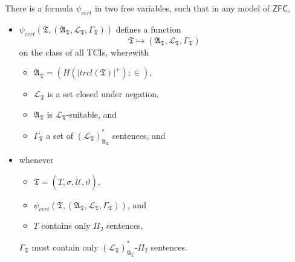 \documentclass[12pt]{article}
\numberwithin{equation}{section}
\begin{document}
\begin{lem}\label{mcequiv}
There is a formula $\psi_{cert}$ in two free variables, such that in any model of $\mathsf{ZFC}$, 
\begin{itemize}
    \item $\psi_{cert}(\mathfrak{T}, (\mathfrak{A}_{\mathfrak{T}}, \mathcal{L}_{\mathfrak{T}}, \Gamma_{\mathfrak{T}}))$ defines a function $$\mathfrak{T} \mapsto (\mathfrak{A}_{\mathfrak{T}}, \mathcal{L}_{\mathfrak{T}}, \Gamma_{\mathfrak{T}})$$ on the class of all TCIs, wherewith
    \begin{itemize}[label=$\circ$]
        \item $\mathfrak{A}_{\mathfrak{T}} = (H(|trcl(\mathfrak{T})|^+); \in)$,
        \item $\mathcal{L}_{\mathfrak{T}}$ is a set closed under negation, 
        \item $\mathfrak{A}_{\mathfrak{T}}$ is $\mathcal{L}_{\mathfrak{T}}$-suitable, and
        \item $\Gamma_{\mathfrak{T}}$ a set of $({\mathcal{L}_{\mathfrak{T}}})^*_{\mathfrak{A}_{\mathfrak{T}}}$ sentences, and
    \end{itemize}
    \item whenever
    \begin{itemize}[label=$\circ$]
        \item $\mathfrak{T} = (T, \sigma, \dot{\mathcal{U}}, \vartheta)$, 
        \item $\psi_{cert}(\mathfrak{T}, (\mathfrak{A}_{\mathfrak{T}}, \mathcal{L}_{\mathfrak{T}}, \Gamma_{\mathfrak{T}}))$, and
        \item $T$ contains only $\Pi_2$ sentences, 
    \end{itemize} 
    $\Gamma_{\mathfrak{T}}$ must contain only $({\mathcal{L}_{\mathfrak{T}}})^{*}_{\mathfrak{A}_{\mathfrak{T}}}$-$\Pi_2$ sentences.
\end{itemize}
\end{lem}
\end{document}
